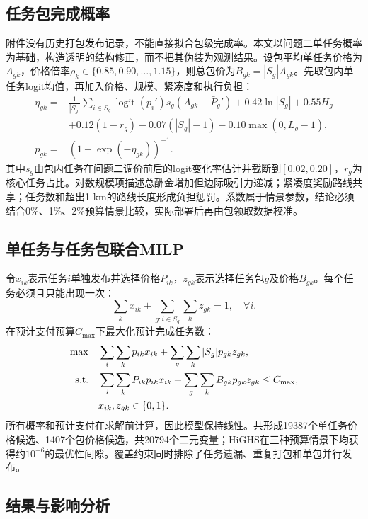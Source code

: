 ﻿\documentclass[UTF8,zihao=-4,a4paper,fontset=fandol]{ctexart}
\begin{document}
\subsection{任务包完成概率}

附件没有历史打包发布记录，不能直接拟合包级完成率。本文以问题二单任务概率为基础，构造透明的结构修正，而不把其伪装为观测结果。设包平均单任务价格为$A_{gk}$，价格倍率$\rho_k\in\{0.85,0.90,\ldots,1.15\}$，则总包价为$B_{gk}=|S_g|A_{gk}$。先取包内单任务logit均值，再加入价格、规模、紧凑度和执行负担：
\begin{align}
 \eta_{gk}={}&\frac{1}{|S_g|}\sum_{i\in S_g}\operatorname{logit}(p_i')
 s_g(A_{gk}-\bar P_g')+0.42\ln |S_g|+0.55H_g \nonumber\\
 &+0.12(1-r_g)-0.07(|S_g|-1)-0.10\max(0,L_g-1),\\
 p_{gk}={}&(1+\exp(-\eta_{gk}))^{-1}.
 \label{eq:bundle-prob}
\end{align}
其中$s_g$由包内任务在问题二调价前后的logit变化率估计并截断到$[0.02,0.20]$，$r_g$为核心任务占比。对数规模项描述总酬金增加但边际吸引力递减；紧凑度奖励路线共享；任务数和超出1 km的路线长度形成负担惩罚。系数属于情景参数，结论必须结合0\%、1\%、2\%预算情景比较，实际部署后再由包领取数据校准。

\subsection{单任务与任务包联合MILP}

令$x_{ik}$表示任务$i$单独发布并选择价格$P_{ik}$，$z_{gk}$表示选择任务包$g$及价格$B_{gk}$。每个任务必须且只能出现一次：
\begin{equation}
 \sum_kx_{ik}+\sum_{g:i\in S_g}\sum_kz_{gk}=1,\quad \forall i.
 \label{eq:cover}
\end{equation}
在预计支付预算$C_{\max}$下最大化预计完成任务数：
\begin{align}
 \max\quad &\sum_i\sum_k p_{ik}x_{ik}
 +\sum_g\sum_k |S_g|p_{gk}z_{gk},\\
 {\rm s.t.}\quad&
 \sum_i\sum_k P_{ik}p_{ik}x_{ik}
 +\sum_g\sum_k B_{gk}p_{gk}z_{gk}\leq C_{\max},\nonumber\\
 &x_{ik},z_{gk}\in\{0,1\}.
 \label{eq:bundle-milp}
\end{align}
所有概率和预计支付在求解前计算，因此模型保持线性。共形成19387个单任务价格候选、1407个包价格候选，共20794个二元变量；HiGHS在三种预算情景下均获得约$10^{-6}$的最优性间隙。覆盖约束同时排除了任务遗漏、重复打包和单包并行发布。

\subsection{结果与影响分析}
\end{document}
